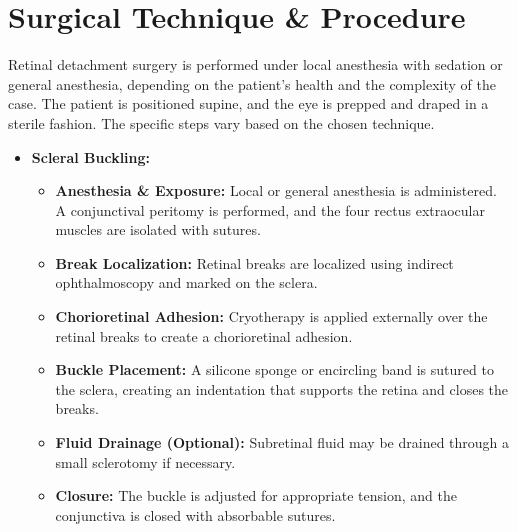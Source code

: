 \section*{Surgical Technique \& Procedure}
Retinal detachment surgery is performed under local anesthesia with sedation or general anesthesia, depending on the patient's health and the complexity of the case. The patient is positioned supine, and the eye is prepped and draped in a sterile fashion. The specific steps vary based on the chosen technique.

\begin{itemize}
  \item \textbf{Scleral Buckling:}
    \begin{itemize}
      \item \textbf{Anesthesia \& Exposure:} Local or general anesthesia is administered. A conjunctival peritomy is performed, and the four rectus extraocular muscles are isolated with sutures.
      \item \textbf{Break Localization:} Retinal breaks are localized using indirect ophthalmoscopy and marked on the sclera.
      \item \textbf{Chorioretinal Adhesion:} Cryotherapy is applied externally over the retinal breaks to create a chorioretinal adhesion.
      \item \textbf{Buckle Placement:} A silicone sponge or encircling band is sutured to the sclera, creating an indentation that supports the retina and closes the breaks.
      \item \textbf{Fluid Drainage (Optional):} Subretinal fluid may be drained through a small sclerotomy if necessary.
      \item \textbf{Closure:} The buckle is adjusted for appropriate tension, and the conjunctiva is closed with absorbable sutures.
    \end{itemize}
  

\end{itemize}
